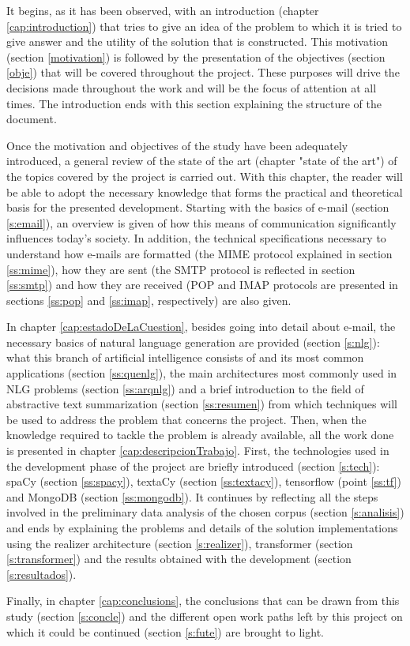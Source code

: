 It begins, as it has been observed, with an introduction (chapter \ref{cap:introduction}) that tries to give an idea of the problem to which it is tried to give answer and the utility of the solution that is constructed. This motivation (section \ref{motivation}) is followed by the presentation of the objectives (section \ref{obje}) that will be covered throughout the project. These purposes will drive the decisions made throughout the work and will be the focus of attention at all times. The introduction ends with this section explaining the structure of the document.

Once the motivation and objectives of the study have been adequately introduced, a general review of the state of the art (chapter "state of the art") of the topics covered by the project is carried out. With this chapter, the reader will be able to adopt the necessary knowledge that forms the practical and theoretical basis for the presented development. Starting with the basics of e-mail (section \ref{s:email}), an overview is given of how this means of communication significantly influences today's society. In addition, the technical specifications necessary to understand how e-mails are formatted (the MIME protocol explained in section \ref{ss:mime}), how they are sent (the SMTP protocol is reflected in section \ref{ss:smtp}) and how they are received (POP and IMAP protocols are presented in sections \ref{ss:pop} and \ref{ss:imap}, respectively) are also given.

In chapter \ref{cap:estadoDeLaCuestion}, besides going into detail about e-mail, the necessary basics of natural language generation are provided (section \ref{s:nlg}): what this branch of artificial intelligence consists of and its most common applications (section \ref{ss:quenlg}), the main architectures most commonly used in NLG problems (section \ref{ss:arqnlg}) and a brief introduction to the field of abstractive text summarization (section \ref{ss:resumen}) from which techniques will be used to address the problem that concerns the project.
Then, when the knowledge required to tackle the problem is already available, all the work done is presented in chapter \ref{cap:descripcionTrabajo}. First, the technologies used in the development phase of the project are briefly introduced (section \ref{s:tech}): spaCy (section \ref{ss:spacy}), textaCy (section \ref{ss:textacy}), tensorflow (point \ref{ss:tf}) and MongoDB (section \ref{ss:mongodb}). It continues by reflecting all the steps involved in the preliminary data analysis of the chosen corpus (section \ref{s:analisis}) and ends by explaining the problems and details of the solution implementations using the realizer architecture (section \ref{s:realizer}), transformer (section \ref{s:transformer}) and the results obtained with the development (section \ref{s:resultados}).

Finally, in chapter \ref{cap:conclusions}, the conclusions that can be drawn from this study (section \ref{s:concle}) and the different open work paths left by this project on which it could be continued (section \ref{s:fute}) are brought to light.







